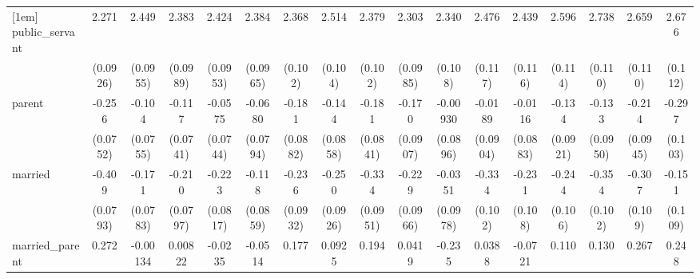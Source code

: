 {\begin{tabular}{l*{16}{c}}
[1em]
public\_servant      &       2.271\sym{***}&       2.449\sym{***}&       2.383\sym{***}&       2.424\sym{***}&       2.384\sym{***}&       2.368\sym{***}&       2.514\sym{***}&       2.379\sym{***}&       2.303\sym{***}&       2.340\sym{***}&       2.476\sym{***}&       2.439\sym{***}&       2.596\sym{***}&       2.738\sym{***}&       2.659\sym{***}&       2.676\sym{***}\\
                    &    (0.0926)         &    (0.0955)         &    (0.0989)         &    (0.0953)         &    (0.0965)         &     (0.102)         &     (0.104)         &     (0.102)         &    (0.0985)         &     (0.108)         &     (0.117)         &     (0.116)         &     (0.114)         &     (0.110)         &     (0.110)         &     (0.112)         \\
[1em]
parent              &      -0.256\sym{***}&      -0.104         &      -0.117         &     -0.0575         &     -0.0680         &      -0.181\sym{*}  &      -0.144         &      -0.181\sym{*}  &      -0.170         &    -0.00930         &     -0.0189         &     -0.0116         &      -0.134         &      -0.133         &      -0.214\sym{*}  &      -0.297\sym{**} \\
                    &    (0.0752)         &    (0.0755)         &    (0.0741)         &    (0.0744)         &    (0.0794)         &    (0.0882)         &    (0.0858)         &    (0.0841)         &    (0.0907)         &    (0.0896)         &    (0.0904)         &    (0.0883)         &    (0.0921)         &    (0.0950)         &    (0.0945)         &     (0.103)         \\
[1em]
married             &      -0.409\sym{***}&      -0.171\sym{*}  &      -0.210\sym{**} &      -0.223\sym{**} &      -0.118         &      -0.236\sym{*}  &      -0.250\sym{**} &      -0.334\sym{***}&      -0.229\sym{*}  &     -0.0351         &      -0.334\sym{**} &      -0.231\sym{*}  &      -0.244\sym{*}  &      -0.354\sym{***}&      -0.307\sym{**} &      -0.151         \\
                    &    (0.0793)         &    (0.0783)         &    (0.0797)         &    (0.0817)         &    (0.0859)         &    (0.0932)         &    (0.0926)         &    (0.0951)         &    (0.0966)         &    (0.0978)         &     (0.102)         &     (0.108)         &     (0.106)         &     (0.102)         &     (0.109)         &     (0.109)         \\
[1em]
married\_parent      &       0.272\sym{**} &    -0.00134         &     0.00822         &     -0.0235         &     -0.0514         &       0.177         &      0.0925         &       0.194         &      0.0419         &      -0.235         &      0.0388         &     -0.0721         &       0.110         &       0.130         &       0.267         &       0.248         \\

\end{tabular}}
